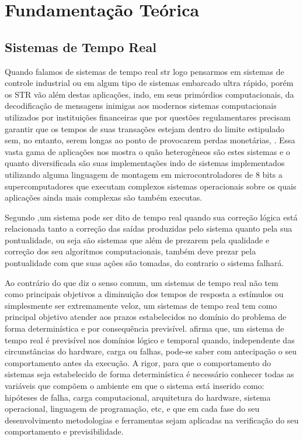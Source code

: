 \chapter{Fundamentação Teórica}
\label{cap:estadoarte}

\section{Sistemas de Tempo Real}
Quando falamos de sistemas de tempo real \gls{str} logo pensarmos em sistemas de controle industrial ou em algum tipo de sistemas embarcado ultra rápido, porém os STR vão além destas aplicações, indo, em seus primórdios computacionais, da decodificação de mensagens inimigas aos modernos sistemas computacionais utilizados por instituições financeiras que por questões regulamentares precisam garantir que os tempos de suas transações estejam dentro do limite estipulado sem, no entanto, serem longas ao ponto de provocarem perdas monetárias, \cite{Rostedt2007}. Essa vasta gama de aplicações nos mostra o quão heterogêneos são estes sistemas e o quanto diversificada são suas implementações indo de sistemas implementados utilizando alguma linguagem de montagem em microcontroladores de 8 bits a supercomputadores que executam complexos sistemas operacionais sobre os quais aplicações ainda mais complexas são também executas.
 
Segundo \cite{Laplante2012},um sistema pode ser dito de tempo real quando sua correção lógica está relacionada tanto a correção das saídas produzidas pelo sistema quanto pela sua pontualidade, ou seja são sistemas que além de prezarem pela qualidade e correção dos seu algoritmos computacionais, também deve prezar pela pontualidade com que suas ações são tomadas, do contrario o sistema falhará.

Ao contrário do que diz o senso comum, um sistemas de tempo real não tem como principais objetivos a diminuição dos tempos de resposta a estímulos ou simplesmente ser extremamente veloz, um sistemas de tempo real tem como principal objetivo atender aos prazos estabelecidos no domínio do problema de forma determinística e por consequência previsível.
\cite{Farines2000} afirma que, um sistema de tempo real é previsível nos domínios lógico e temporal quando, independente das circunstâncias do hardware, carga ou falhas, pode-se saber com antecipação o seu comportamento antes da execução. A rigor, para que o comportamento do sistemas seja estabelecido de forma determinística é necessário conhecer todas as variáveis que compõem o ambiente em que o sistema está inserido como: hipóteses de falha, carga computacional, arquitetura do hardware, sistema operacional, linguagem de programação, etc, e que em cada fase do seu desenvolvimento metodologias e ferramentas sejam aplicadas na verificação do seu comportamento e previsibilidade.

